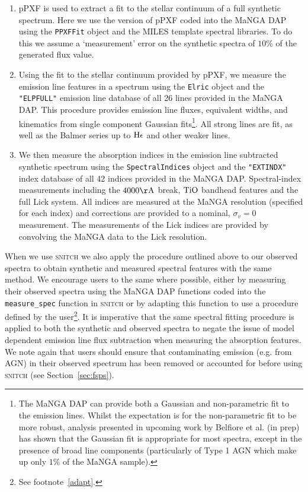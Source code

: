 \documentclass[useAMS,usenatbib]{mn2e}
\def\referee		{\color{refer}}
\begin{document}
\begin{enumerate}
\item pPXF \citep{cappellari04} is used to extract a fit to the stellar continuum of a full synthetic spectrum. Here we use the version of pPXF coded into the MaNGA DAP using the \texttt{PPXFFit} object and the MILES template spectral libraries. To do this we assume a `measurement' error on the synthetic spectra of $10\%$ of the generated flux value. 
\item Using the fit to the stellar continuum provided by pPXF, we measure the emission line features in a spectrum using the \texttt{Elric} object and the \texttt{"ELPFULL"} emission line database of all 26 lines provided in the MaNGA DAP. This procedure provides emission line fluxes, equivalent widths, and kinematics from single component Gaussian fits\footnote{{\referee The MaNGA DAP can provide both a Gaussian and non-parametric fit to the emission lines. Whilst the expectation is for the non-parametric fit to be more robust, analysis presented in upcoming work by Belfiore et al. (in prep) has shown that the Gaussian fit is appropriate for most spectra, except in the presence of broad line components (particularly of Type 1 AGN which make up only $1\%$ of the MaNGA sample).}}. All strong lines are fit, as well as the Balmer series up to $\rm{H}\epsilon$ and other weaker lines. 
\item We then measure the absorption indices in the emission line subtracted synthetic spectrum using the \texttt{SpectralIndices} object and the \texttt{"EXTINDX"} index database of all 42 indices provided in the MaNGA DAP. Spectral-index measurements including the $4000\rm{\AA}$ break, $\rm{TiO}$ bandhead features and the full Lick system. All indices are measured at the MaNGA resolution (specified for each index) and corrections are provided to a nominal, $\sigma_v = 0$ measurement. The measurements of the Lick indices are provided by convolving the MaNGA data to the Lick resolution. 
\end{enumerate}

When we use \textsc{snitch} we also apply the procedure outlined above to our observed spectra to obtain synthetic and measured spectral features with the same method. We encourage users to the same where possible, either by measuring their observed spectra using the MaNGA DAP functions coded into the \texttt{measure\_spec} function in \textsc{snitch} or by adapting this function to use a procedure defined by the user\footnote{See footnote~\ref{adapt}.}. {\referee It is imperative that the same spectral fitting procedure is applied to both the synthetic and observed spectra to negate the issue of model dependent emission line flux subtraction when measuring the absorption features. We note again that users should ensure that contaminating emission (e.g. from AGN) in their observed spectrum has been removed or accounted for before using \textsc{snitch} (see Section~\ref{sec:fsps}).}
\end{document}
